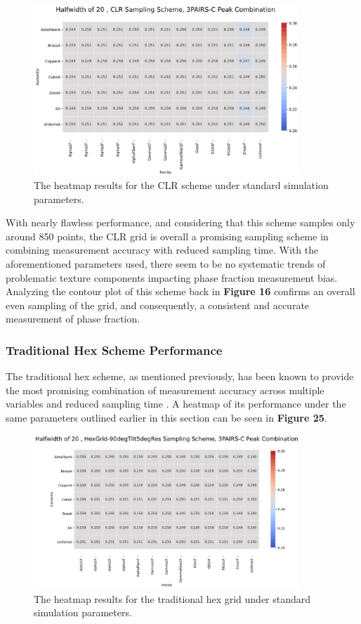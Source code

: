 \documentclass[10pt]{article}
\begin{document}
\begin{figure}[h]
    \centering
    \includegraphics[width=10cm]{fig24}
    \caption{\label{tab1}The heatmap results for the CLR scheme under standard simulation parameters.} 
    \end{figure}

With nearly flawless performance, and considering that this scheme samples only
around 850 points, the CLR grid is overall a promising sampling scheme in combining
measurement accuracy with reduced sampling time. With the aforementioned parameters used,
there seem to be no systematic trends of problematic texture components impacting
phase fraction measurement bias. Analyzing the contour plot of this scheme back in
\textbf{Figure 16} confirms an overall even sampling of the grid, and consequently, a 
consistent and accurate measurement of phase fraction.

\subsubsection{Traditional Hex Scheme Performance}
The traditional hex scheme, as mentioned previously, has been known to provide the 
most promising combination of measurement accuracy across multiple variables
and reduced sampling time \cite{ref14}. A heatmap of its performance under the same parameters
outlined earlier in this section can be seen in \textbf{Figure 25}.

\begin{figure}[h]
    \centering
    \includegraphics[width=10cm]{fig25}
    \caption{\label{tab1}The heatmap results for the traditional hex grid under standard simulation parameters.} 
    \end{figure}
\end{document}
